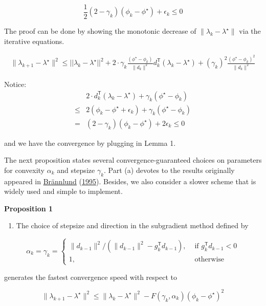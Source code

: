 \documentclass[
  a4paper,
,tablecaptionabove
]{scrartcl}
\numberwithin{equation}{section}
\providecommand{\tightlist}{%
  \setlength{\itemsep}{0pt}\setlength{\parskip}{0pt}}
\begin{document}
\[\frac{1}{2}(2 - \gamma_k) (\phi_{k} - \phi^\star)  + \epsilon_k \le 0\]

The proof can be done by showing the monotonic decrease of
\(\|\lambda_{k} - \lambda^\star\|\) via the iterative equations.

\[\begin{aligned}
    \|\lambda_{k+1} - \lambda^\star\|^2 \le ||\lambda_k - \lambda^\star||^2
    + 2\cdot \gamma_k \frac{(\phi^\star - \phi_{k})}{\|d_{k}\|^{2}} d_k^\mathsf{T}(\lambda_k - \lambda^\star)
    + (\gamma_{k})^{2} \frac{(\phi^\star - \phi_{k})^{2}}{\|d_{k}\|^{2}}
  \end{aligned}\]

Notice: \[\begin{aligned}
        & 2  \cdot d_k^\mathsf{T}(\lambda_k - \lambda^\star) + \gamma_{k}(\phi^\star - \phi_{k}) \\
    \le & 2 (\phi_{k} - \phi^\star + \epsilon_k) + \gamma_k(\phi^\star -\phi_k)                  \\
    =   & (2 - \gamma_k) (\phi_{k} - \phi^\star)  + 2\epsilon_k \le 0
  \end{aligned}\]

and we have the convergence by plugging in Lemma 1.

The next proposition states several convergence-guaranteed choices on
parameters for convexity \(\alpha_k\) and stepsize \(\gamma_k\). Part
(a) devotes to the results originally appeared in
\protect\hyperlink{ref-brannlund1995generalized}{Brännlund}
(\protect\hyperlink{ref-brannlund1995generalized}{1995}). Besides, we
also consider a slower scheme that is widely used and simple to
implement.

\textbf{Proposition 1}

\begin{enumerate}
  \def\labelenumi{(\alph{enumi})}
  \tightlist
  \item
        The choice of stepsize and direction in the subgradient method defined
        by
\end{enumerate}

\[\alpha_{k}=\gamma_{k}=\begin{cases}\|d_{k-1}\|^2 /(\|d_{k-1}\|^2- g_{k}^\mathsf{T} d_{k-1}), & \text { if } g_{k}^\mathsf{T} d_{k-1} <0 \\ 1, & \text { otherwise }\end{cases}\]

generates the fastest convergence speed with respect to

\[\|\lambda_{k+1}-\lambda^\star\|^{2} \leqslant\|\lambda_{k}-\lambda^\star\|^{2}-F(\gamma_{k}, \alpha_{k})(\phi_k-\phi^\star)^{2}\]
\end{document}
